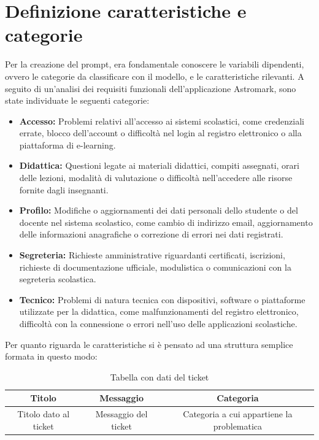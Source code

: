 \section{Definizione caratteristiche e categorie}
Per la creazione del prompt, era fondamentale conoscere le variabili dipendenti, ovvero le categorie da classificare con il modello, e le caratteristiche rilevanti. A seguito di un'analisi dei requisiti funzionali dell'applicazione Astromark, sono state individuate le seguenti categorie:
\begin{itemize}
    \item \textbf{Accesso:} Problemi relativi all'accesso ai sistemi scolastici, come credenziali errate, blocco dell'account o difficoltà nel login al registro elettronico o alla piattaforma di e-learning.
    \item \textbf{Didattica:} Questioni legate ai materiali didattici, compiti assegnati, orari delle lezioni, modalità di valutazione o difficoltà nell'accedere alle risorse fornite dagli insegnanti.
    \item \textbf{Profilo:} Modifiche o aggiornamenti dei dati personali dello studente o del docente nel sistema scolastico, come cambio di indirizzo email, aggiornamento delle informazioni anagrafiche o correzione di errori nei dati registrati.
    \item \textbf{Segreteria:}  Richieste amministrative riguardanti certificati, iscrizioni, richieste di documentazione ufficiale, modulistica o comunicazioni con la segreteria scolastica.
    \item \textbf{Tecnico:} Problemi di natura tecnica con dispositivi, software o piattaforme utilizzate per la didattica, come malfunzionamenti del registro elettronico, difficoltà con la connessione o errori nell'uso delle applicazioni scolastiche.
\end{itemize}
Per quanto riguarda le caratteristiche si è pensato ad una struttura semplice formata in questo modo:
\begin{table}[h]
    \centering
    \begin{tabular}{|c|c|c|}
        \hline
        \textbf{Titolo} & \textbf{Messaggio} & \textbf{Categoria} \\
        \hline
        Titolo dato al ticket & Messaggio del ticket & Categoria a cui appartiene la problematica \\
        \hline
    \end{tabular}
    \caption{Tabella con dati del ticket}
    \label{tab:tickets}
\end{table}

